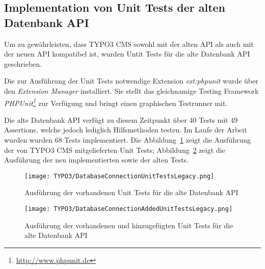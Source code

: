 \subsection{Implementation von Unit Tests der alten Datenbank API}
\label{prototype:sec:createTestForOldAPI}
Um zu gewährleisten, dass TYPO3 CMS sowohl mit der alten API als auch mit der neuen API kompatibel ist, wurden Untit Tests für die alte Datenbank API geschrieben.

Die zur Ausführung der Unit Tests notwendige Extension \textit{ext:phpunit} wurde über den \textit{Extension Manager} installiert. Sie stellt das gleichnamige Testing Framework \textit{PHPUnit\footnote{\url{http://www.phpunit.de}}} zur Verfügung und bringt einen graphischen Testrunner mit.

Die alte Datenbank API verfügt zu diesem Zeitpunkt über 40 Tests mit 49 Assertions, welche jedoch lediglich Hilfsmethoden testen. Im Laufe der Arbeit wurden wurden 68 Tests implementiert. Die Abbildung~\ref{fig:executeUnitTestsForOldAPI} zeigt die Ausführung der von TYPO3 CMS mitgelieferten Unit Tests; Abbildung~\ref{fig:executeNewUnitTestsForOldAPI} zeigt die Ausführung der neu implementierten sowie der alten Tests.

\begin{figure}[H]
    \centering
    \texttt{[image: TYPO3/DatabaseConnectionUnitTestsLegacy.png]}
    \caption{Ausführung der vorhandenen Unit Tests für die alte Datenbank API}
    \label{fig:executeUnitTestsForOldAPI}
\end{figure}

\begin{figure}[H]
    \centering
    \texttt{[image: TYPO3/DatabaseConnectionAddedUnitTestsLegacy.png]}
    \caption{Ausführung der vorhandenen und hinzugefügten Unit Tests für die alte Datenbank API}
    \label{fig:executeNewUnitTestsForOldAPI}
\end{figure}
